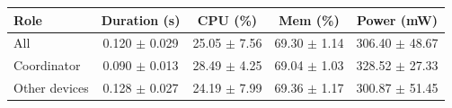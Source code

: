 \begin{tabular}{lcccc}
\hline
\textbf{Role} & \textbf{Duration (s)} & \textbf{CPU (\%)} & \textbf{Mem (\%)} & \textbf{Power (mW)} \\
\hline
All & 0.120 $\pm$ 0.029 & 25.05 $\pm$ 7.56 & 69.30 $\pm$ 1.14 & 306.40 $\pm$ 48.67 \\
Coordinator & 0.090 $\pm$ 0.013 & 28.49 $\pm$ 4.25 & 69.04 $\pm$ 1.03 & 328.52 $\pm$ 27.33 \\
Other devices & 0.128 $\pm$ 0.027 & 24.19 $\pm$ 7.99 & 69.36 $\pm$ 1.17 & 300.87 $\pm$ 51.45 \\
\hline
\end{tabular}
